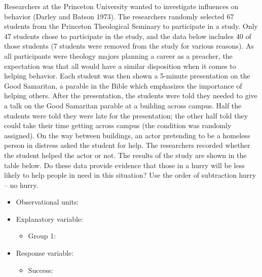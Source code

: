\documentclass[
]{report}
\providecommand{\tightlist}{%
  \setlength{\itemsep}{0pt}\setlength{\parskip}{0pt}}
\begin{document}
Researchers at the Princeton University wanted to investigate influences on behavior (Darley and Batson 1973). The researchers randomly selected 67 students from the Princeton Theological Seminary to participate in a study. Only 47 students chose to participate in the study, and the data below includes 40 of those students (7 students were removed from the study for various reasons). As all participants were theology majors planning a career as a preacher, the expectation was that all would have a similar disposition when it comes to helping behavior. Each student was then shown a 5-minute presentation on the Good Samaritan, a parable in the Bible which emphasizes the importance of helping others. After the presentation, the students were told they needed to give a talk on the Good Samaritan parable at a building across campus. Half the students were told they were late for the presentation; the other half told they could take their time getting across campus (the condition was randomly assigned). On the way between buildings, an actor pretending to be a homeless person in distress asked the student for help. The researchers recorded whether the student helped the actor or not. The results of the study are shown in the table below. Do these data provide evidence that those in a hurry will be less likely to help people in need in this situation? Use the order of subtraction hurry -- no hurry.

\vspace{2mm}

\begin{itemize}
\tightlist
\item
  Observational units:
\end{itemize}

\vspace{2mm}

\begin{itemize}
\item
  Explanatory variable:

  \begin{itemize}
  \tightlist
  \item
    Group 1:
  \end{itemize}
\end{itemize}

\vspace{2mm}

\begin{itemize}
\item
  Response variable:

  \begin{itemize}
  \tightlist
  \item
    Success:
  \end{itemize}
\end{itemize}
\end{document}
